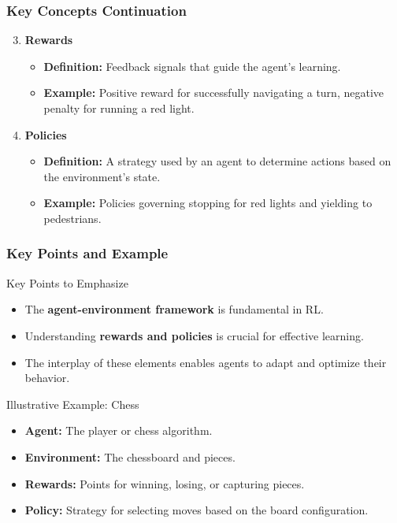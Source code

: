 \documentclass{beamer}
\begin{document}
\begin{frame}[fragile]
    \frametitle{Key Concepts Continuation}

    \begin{enumerate}
        \setcounter{enumi}{2}
        \item \textbf{Rewards}
            \begin{itemize}
                \item \textbf{Definition:} Feedback signals that guide the agent's learning.
                \item \textbf{Example:} Positive reward for successfully navigating a turn, negative penalty for running a red light.
            \end{itemize}
        \item \textbf{Policies}
            \begin{itemize}
                \item \textbf{Definition:} A strategy used by an agent to determine actions based on the environment's state.
                \item \textbf{Example:} Policies governing stopping for red lights and yielding to pedestrians.
            \end{itemize}
    \end{enumerate}
\end{frame}

\begin{frame}[fragile]
    \frametitle{Key Points and Example}

    \begin{block}{Key Points to Emphasize}
        \begin{itemize}
            \item The \textbf{agent-environment framework} is fundamental in RL.
            \item Understanding \textbf{rewards and policies} is crucial for effective learning.
            \item The interplay of these elements enables agents to adapt and optimize their behavior.
        \end{itemize}
    \end{block}

    \begin{block}{Illustrative Example: Chess}
        \begin{itemize}
            \item \textbf{Agent:} The player or chess algorithm.
            \item \textbf{Environment:} The chessboard and pieces.
            \item \textbf{Rewards:} Points for winning, losing, or capturing pieces.
            \item \textbf{Policy:} Strategy for selecting moves based on the board configuration.
        \end{itemize}
    \end{block}
\end{frame}
\end{document}
